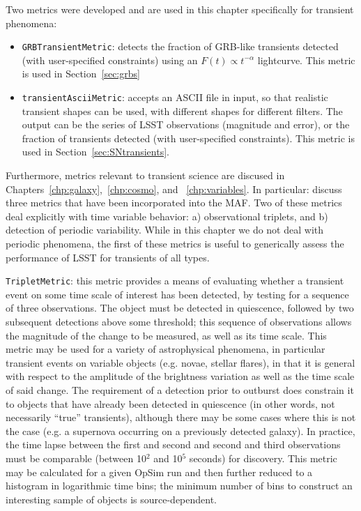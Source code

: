 %


Two metrics were developed and are used in this chapter specifically for transient phenomena:
\begin{itemize}
  \item{\texttt{GRBTransientMetric}: detects the fraction of GRB-like transients detected (with user-specified constraints) using an $F(t) \propto t^{-\alpha}$
    lightcurve. This metric is used in Section~\ref{sec:grbs}}
  \item{\texttt{transientAsciiMetric}: accepts an ASCII file in input, so that realistic transient shapes can be used, with different shapes for different filters. The output can be the series of LSST observations (magnitude and error), or the fraction of transients detected (with user-specified constraints). This metric is used in Section~\ref{sec:SNtransients}.}
\end{itemize}

Furthermore, metrics relevant to transient science are discused in Chapters~\ref{chp:galaxy},~\ref{chp:cosmo}, and ~\ref{chp:variables}. In particular:
\citet{2015arXiv150803175L} discuss
three metrics that have been incorporated into the MAF. Two of these
metrics deal explicitly with time variable behavior: a) observational
triplets, and b) detection of periodic variability. While in this
chapter we do not deal with periodic phenomena, the first of these
metrics is useful to generically assess the performance of LSST for
transients of all types.

\texttt{TripletMetric}: this metric provides a means of evaluating whether a transient event
on some time scale of interest has been detected, by testing for a
sequence of three observations. The object must be detected in
quiescence, followed by two subsequent detections above some
threshold; this sequence of observations allows the magnitude of the
change to be measured, as well as its time scale.
This metric may be used for a variety of astrophysical phenomena, in
particular transient events on variable objects (e.g. novae, stellar
flares), in that it is general with respect to the amplitude of the
brightness variation as well as the time scale of said change. The
requirement of a detection prior to outburst does constrain it to
objects that have already been detected in quiescence (in other words,
not necessarily ``true'' transients), although there may be some cases
where this is not the case (e.g. a supernova occurring on a previously
detected galaxy). In practice, the time lapse between the first and
second and second and third observations must be comparable (between
10$^2$ and 10$^5$ seconds) for discovery. This metric may be
calculated for a given OpSim run and then further reduced to a
histogram in logarithmic time bins; the minimum number of bins to
construct an interesting sample of objects is source-dependent.

